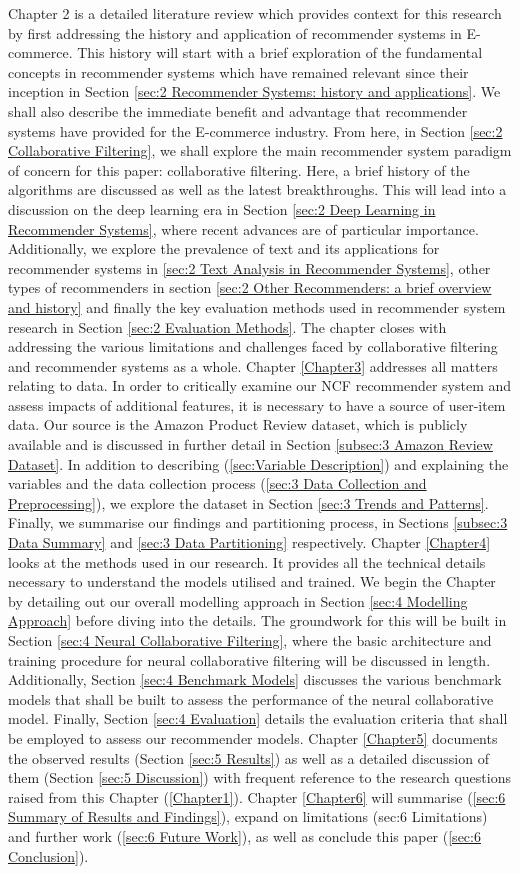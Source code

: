 Chapter 2 is a detailed literature review which provides context for this research by first addressing the history and application of recommender systems in E-commerce. This history will start with a brief exploration of the fundamental concepts in recommender systems which have remained relevant since their inception in Section \ref{sec:2 Recommender Systems: history and applications}. We shall also describe the immediate benefit and advantage that recommender systems have provided for the E-commerce industry. From here, in Section \ref{sec:2 Collaborative Filtering}, we shall explore the main recommender system paradigm of concern for this paper: collaborative filtering. Here, a brief history of the algorithms are discussed as well as the latest breakthroughs. This will lead into a discussion on the deep learning era in Section \ref{sec:2 Deep Learning in Recommender Systems}, where recent advances are of particular importance. Additionally, we explore the prevalence of text and its applications for recommender systems in \ref{sec:2 Text Analysis in Recommender Systems}, other types of recommenders in section \ref{sec:2 Other Recommenders: a brief overview and history} and finally the key evaluation methods used in recommender system research in Section \ref{sec:2 Evaluation Methods}. The chapter closes with addressing the various limitations and challenges faced by collaborative filtering and recommender systems as a whole. Chapter \ref{Chapter3} addresses all matters relating to data. In order to critically examine our NCF recommender system and assess impacts of additional features, it is necessary to have a source of user-item data. Our source is the Amazon Product Review dataset, which is publicly available and is discussed in further detail in Section \ref{subsec:3 Amazon Review Dataset}. In addition to describing (\ref{sec:Variable Description}) and explaining the variables and the data collection process (\ref{sec:3 Data Collection and Preprocessing}), we explore the dataset in Section \ref{sec:3 Trends and Patterns}. Finally, we summarise our findings and partitioning process, in Sections \ref{subsec:3 Data Summary} and \ref{sec:3 Data Partitioning} respectively. Chapter \ref{Chapter4} looks at the methods used in our research. It provides all the technical details necessary to understand the models utilised and trained. We begin the Chapter by detailing out our overall modelling approach in Section \ref{sec:4 Modelling Approach} before diving into the details. The groundwork for this will be built in Section \ref{sec:4 Neural Collaborative Filtering}, where the basic architecture and training procedure for neural collaborative filtering will be discussed in length. Additionally, Section \ref{sec:4 Benchmark Models} discusses the various benchmark models that shall be built to assess the performance of the neural collaborative model. Finally, Section \ref{sec:4 Evaluation} details the evaluation criteria that shall be employed to assess our recommender models. Chapter \ref{Chapter5} documents the observed results (Section \ref{sec:5 Results}) as well as a detailed discussion of them (Section \ref{sec:5 Discussion}) with frequent reference to the research questions raised from this Chapter (\ref{Chapter1}).  Chapter \ref{Chapter6} will summarise (\ref{sec:6 Summary of Results and Findings}), expand on limitations (sec:6 Limitations) and further work (\ref{sec:6 Future Work}), as well as conclude this paper (\ref{sec:6 Conclusion}). 






